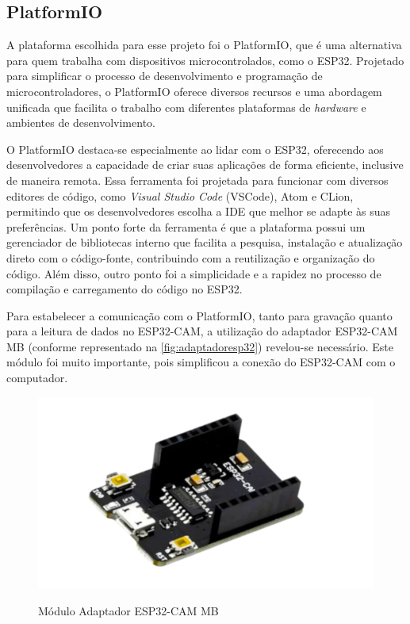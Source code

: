 \subsection{PlatformIO}\label{sec:platformio}

A plataforma escolhida para esse projeto foi o PlatformIO, 
que é uma alternativa para quem trabalha com dispositivos 
microcontrolados, como o ESP32. Projetado para simplificar o processo 
de desenvolvimento e programação de microcontroladores, o PlatformIO 
oferece diversos recursos e uma abordagem unificada que 
facilita o trabalho com diferentes plataformas de \textit{hardware} e 
ambientes de desenvolvimento.

O PlatformIO destaca-se especialmente ao lidar com o ESP32, 
oferecendo aos desenvolvedores a capacidade de criar suas 
aplicações de forma eficiente, inclusive de maneira remota.
Essa ferramenta foi projetada para funcionar com diversos editores de 
código, como \textit{Visual Studio Code} (VSCode), Atom e CLion,  
permitindo que os desenvolvedores escolha a IDE que melhor 
se adapte às suas preferências. Um ponto forte da ferramenta 
é que a plataforma possui um gerenciador de bibliotecas interno que facilita a 
pesquisa, instalação e atualização direto com o código-fonte, contribuindo 
com a reutilização e organização do código. Além disso, outro ponto foi a 
simplicidade e a rapidez no processo de compilação e carregamento do código 
no ESP32.

Para estabelecer a comunicação com o PlatformIO, tanto para gravação quanto para 
a leitura de dados no ESP32-CAM, a utilização do adaptador ESP32-CAM MB 
(conforme representado na \autoref{fig:adaptadoresp32}) revelou-se necessário. 
Este módulo foi muito importante, pois simplificou a conexão do ESP32-CAM 
com o computador.

\begin{figure}[h!]
    \centering
    \caption{Módulo Adaptador ESP32-CAM MB}
    \includegraphics[scale=0.25]{figuras/adaptador_esp32cam.png}
    \label{fig:adaptadoresp32}
    \centering
\end{figure}

